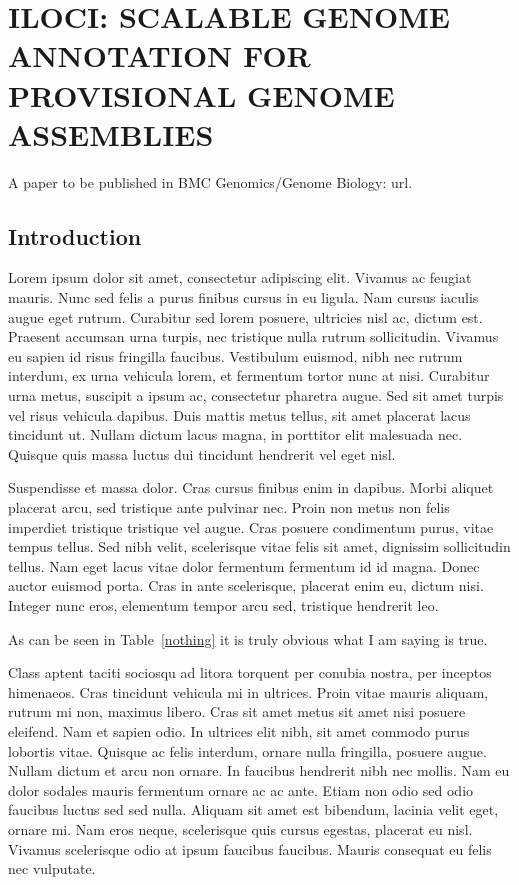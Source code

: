 \chapter{ILOCI: SCALABLE GENOME ANNOTATION FOR PROVISIONAL GENOME ASSEMBLIES}

A paper to be published in BMC Genomics/Genome Biology: url.

\section{Introduction}

Lorem ipsum dolor sit amet, consectetur adipiscing elit. Vivamus ac feugiat mauris. Nunc sed felis a purus finibus cursus in eu ligula. Nam cursus iaculis augue eget rutrum. Curabitur sed lorem posuere, ultricies nisl ac, dictum est. Praesent accumsan urna turpis, nec tristique nulla rutrum sollicitudin. Vivamus eu sapien id risus fringilla faucibus. Vestibulum euismod, nibh nec rutrum interdum, ex urna vehicula lorem, et fermentum tortor nunc at nisi. Curabitur urna metus, suscipit a ipsum ac, consectetur pharetra augue. Sed sit amet turpis vel risus vehicula dapibus. Duis mattis metus tellus, sit amet placerat lacus tincidunt ut. Nullam dictum lacus magna, in porttitor elit malesuada nec. Quisque quis massa luctus dui tincidunt hendrerit vel eget nisl.

Suspendisse et massa dolor. Cras cursus finibus enim in dapibus. Morbi aliquet placerat arcu, sed tristique ante pulvinar nec. Proin non metus non felis imperdiet tristique tristique vel augue. Cras posuere condimentum purus, vitae tempus tellus. Sed nibh velit, scelerisque vitae felis sit amet, dignissim sollicitudin tellus. Nam eget lacus vitae dolor fermentum fermentum id id magna. Donec auctor euismod porta. Cras in ante scelerisque, placerat enim eu, dictum nisi. Integer nunc eros, elementum tempor arcu sed, tristique hendrerit leo.

As can be seen in Table~\ref{nothing} it is truly obvious what I am saying is true.

\begin{table}[h!tb] \centering
{}
\label{nothing}
\vspace{ 2 in}
\end{table}

Class aptent taciti sociosqu ad litora torquent per conubia nostra, per inceptos himenaeos. Cras tincidunt vehicula mi in ultrices. Proin vitae mauris aliquam, rutrum mi non, maximus libero. Cras sit amet metus sit amet nisi posuere eleifend. Nam et sapien odio. In ultrices elit nibh, sit amet commodo purus lobortis vitae. Quisque ac felis interdum, ornare nulla fringilla, posuere augue. Nullam dictum et arcu non ornare. In faucibus hendrerit nibh nec mollis. Nam eu dolor sodales mauris fermentum ornare ac ac ante. Etiam non odio sed odio faucibus luctus sed sed nulla. Aliquam sit amet est bibendum, lacinia velit eget, ornare mi. Nam eros neque, scelerisque quis cursus egestas, placerat eu nisl. Vivamus scelerisque odio at ipsum faucibus faucibus. Mauris consequat eu felis nec vulputate.

